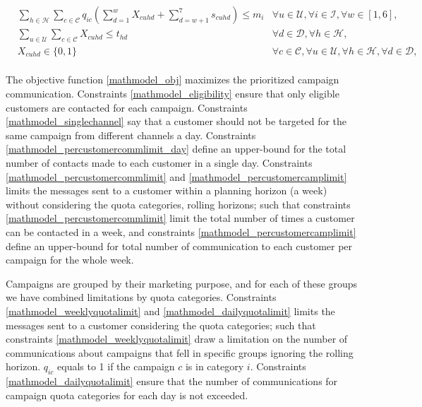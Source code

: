 \documentclass[11pt]{article}
\begin{document}
\begin{align}
&\sum\limits_{h\in\mathcal{H}}\sum\limits_{c\in\mathcal{C}}q_{{i}{c}}\left(\sum_{d=1}^{w}X_{{c}{u}{h}{d}} + \sum_{d=w+1}^{7}s_{{c}{u}{h}{d}}\right) \leq m_{i} &\forall u \in \mathcal{U}, \forall i \in \mathcal{I}, \forall w \in [1,6], \label{mathmodel_weeklyquotalimit_rh}&\\
&\sum\limits_{u\in\mathcal{U}}\sum\limits_{c\in\mathcal{C}}X_{{c}{u}{h}{d}} \leq t_{{h}{d}} &\forall d \in \mathcal{D}, \forall h \in \mathcal{H}, \label{mathmodel_channellimit}&\\
&X_{{c}{u}{h}{d}} \in \{0,1\}&\forall c \in \mathcal{C}, \forall u \in \mathcal{U}, \forall h \in \mathcal{H}, \forall d \in \mathcal{D}, \label{mathmodel_integrity}
\end{align}\\
The objective function \eqref{mathmodel_obj} maximizes the prioritized campaign communication. Constraints \eqref{mathmodel_eligibility} ensure that only eligible customers are contacted for each campaign. Constraints \eqref{mathmodel_singlechannel} say that a customer should not be targeted for the same campaign from different channels a day. Constraints \eqref{mathmodel_percustomercommlimit_day} define an upper-bound for the total number of contacts made to each customer in a single day. Constraints \eqref{mathmodel_percustomercommlimit} and \eqref{mathmodel_percustomercamplimit} limits the messages sent to a customer within a planning horizon (a week) without considering the quota categories, rolling horizons; such that constraints \eqref{mathmodel_percustomercommlimit} limit the total number of times a customer can be contacted in a week, and constraints \eqref{mathmodel_percustomercamplimit} define an upper-bound for total number of communication to each customer per campaign for the whole week.

Campaigns are grouped by their marketing purpose, and for each of these groups we have combined limitations by quota categories. Constraints \eqref{mathmodel_weeklyquotalimit} and \eqref{mathmodel_dailyquotalimit} limits the messages sent to a customer considering the quota categories; such that constraints \eqref{mathmodel_weeklyquotalimit} draw a limitation on the number of communications about campaigns that fell in specific groups ignoring the rolling horizon. $q_{{i}{c}}$ equals to 1 if the campaign $c$ is in category $i$. Constraints \eqref{mathmodel_dailyquotalimit} ensure that the number of communications for campaign quota categories for each day is not exceeded.
\end{document}
